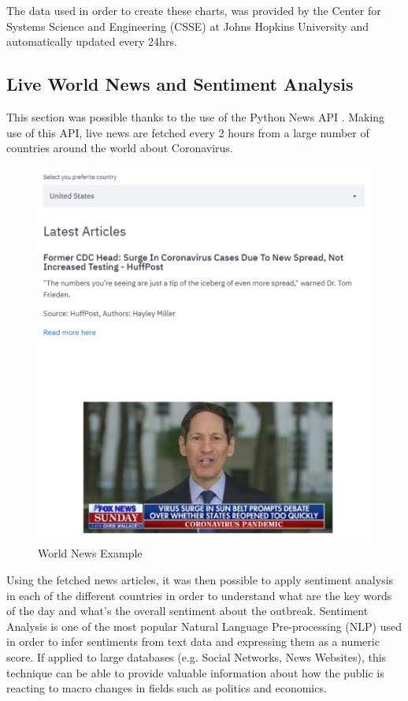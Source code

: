 The data used in order to create these charts, was provided by the Center for Systems Science and Engineering (CSSE) at Johns Hopkins University \cite{world_data} and automatically updated every 24hrs.

\subsection{Live World News and Sentiment Analysis}

This section was possible thanks to the use of the Python News API \cite{news}. Making use of this API, live news are fetched every 2 hours from a large number of countries around the world about Coronavirus. 

\begin{figure}[ht!]%
    \centering
    \includegraphics[width=0.8\linewidth]{latex/images/news.pdf}
    \caption{World News Example}
    \label{news}
\end{figure}

Using the fetched news articles, it was then possible to apply sentiment analysis in each of the different countries in order to understand what are the key words of the day and what's the overall sentiment about the outbreak. Sentiment Analysis is one of the most popular Natural Language Pre-processing (NLP) used in order to infer sentiments from text data and expressing them as a numeric score. If applied to large databases (e.g. Social Networks, News Websites), this technique can be able to provide valuable information about how the public is reacting to macro changes in fields such as politics and economics.

